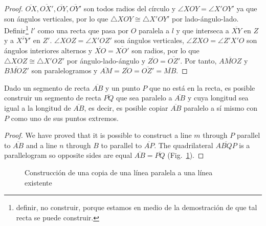 \begin{proof}
$\overline{OX}, \overline{OX'}, \overline{OY}, \overline{OY'}$ son todos radios del círculo y $\angle XOY = \angle X'OY'$ ya que son ángulos verticales, por lo que $\triangle XOY\cong\triangle X'OY'$ por lado-ángulo-lado. Definir\footnote{definir, no construir, porque estamos en medio de la demostración de que tal recta se puede construir.} $l'$ como una recta que pasa por $O$ paralela a $l$ y que interseca a $\overline{XY}$ en $Z$ y a $\overline{X'Y'}$ en $Z'$. $\angle XOZ=\angle X'OZ'$ son ángulos verticales, $\angle ZXO=\angle Z'X'O$ son ángulos interiores alternos y $\overline{XO}=\overline{XO'}$ son radios, por lo que $\triangle XOZ\cong\triangle X'OZ'$ por ángulo-lado-ángulo y $\overline{ZO}=\overline{OZ'}$. Por tanto, $\overline{AMOZ}$ y $\overline{BMOZ'}$ son paralelogramos y $\overline{AM}=\overline{ZO}=\overline{OZ'}=\overline{MB}$.
\end{proof}

\begin{theorem}\label{thm.parallel-equal}
Dado un segmento de recta $\overline{AB}$ y un punto $P$ que no está en la recta, es posible construir un segmento de recta $\overline{PQ}$ que sea paralelo a $\overline{AB}$ y cuya longitud sea igual a la longitud de $\overline{AB}$, es decir, es posible copiar $\overline{AB}$ paralelo a sí mismo con $P$ como uno de sus puntos extremos.
\end{theorem}

\begin{proof}
We have proved that it is possible to construct a line $m$ through $P$ parallel to $\overline{AB}$ and a line $n$ through $B$ to parallel to $\overline{AP}$. The quadrilateral $\overline{ABQP}$ is a parallelogram so opposite sides are equal $\overline{AB}=\overline{PQ}$ (Fig.~\ref{f.se-parallel-other4}).
\end{proof}

\begin{figure}[t]
\begin{center}
\end{center}
\caption{Construcción de una copia de una línea paralela a una línea existente}\label{f.se-parallel-other4}
\end{figure}


